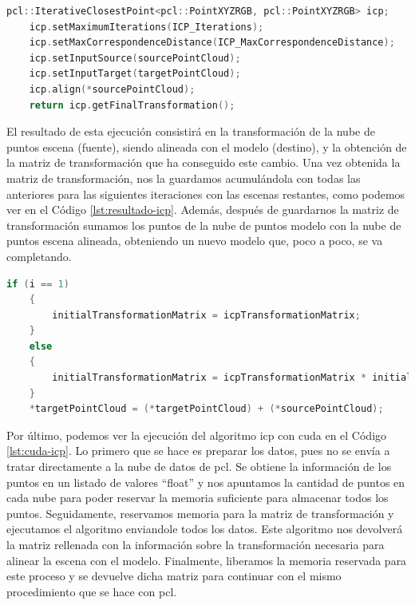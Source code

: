 \begin{lstlisting}[language={C++}, caption={Preparación y llamada al algoritmo ICP de Point Cloud Library}, label={lst:plc-icp}]
    pcl::IterativeClosestPoint<pcl::PointXYZRGB, pcl::PointXYZRGB> icp;
    icp.setMaximumIterations(ICP_Iterations);
    icp.setMaxCorrespondenceDistance(ICP_MaxCorrespondenceDistance);
    icp.setInputSource(sourcePointCloud);
    icp.setInputTarget(targetPointCloud);
    icp.align(*sourcePointCloud);
    return icp.getFinalTransformation();
\end{lstlisting}

El resultado de esta ejecución consistirá en la transformación de la nube de puntos escena (fuente), siendo alineada con el modelo (destino), y la obtención de la matriz de transformación que ha conseguido este cambio.
Una vez obtenida la matriz de transformación, nos la guardamos acumulándola con todas las anteriores para las siguientes iteraciones con las escenas restantes, como podemos ver en el Código \ref{lst:resultado-icp}.
Además, después de guardarnos la matriz de transformación sumamos los puntos de la nube de puntos modelo con la nube de puntos escena alineada, obteniendo un nuevo modelo que, poco a poco, se va completando.

\begin{lstlisting}[language={C++}, caption={Resultado del algoritmo ICP. Matriz de Transformación y nube de puntos resultante}, label={lst:resultado-icp}]
    if (i == 1)
    {
        initialTransformationMatrix = icpTransformationMatrix;
    }
    else
    {
        initialTransformationMatrix = icpTransformationMatrix * initialTransformationMatrix;
    }
    *targetPointCloud = (*targetPointCloud) + (*sourcePointCloud);
\end{lstlisting}

Por último, podemos ver la ejecución del algoritmo \gls{icp} con \gls{cuda} en el Código \ref{lst:cuda-icp}.
Lo primero que se hace es preparar los datos, pues no se envía a tratar directamente a la nube de datos de \gls{pcl}.
Se obtiene la información de los puntos en un listado de valores ``float'' y nos apuntamos la cantidad de puntos en cada nube para poder reservar la memoria suficiente para almacenar todos los puntos.
Seguidamente, reservamos memoria para la matriz de transformación y ejecutamos el algoritmo enviandole todos los datos.
Este algoritmo nos devolverá la matriz rellenada con la información sobre la transformación necesaria para alinear la escena con el modelo.
Finalmente, liberamos la memoria reservada para este proceso y se devuelve dicha matriz para continuar con el mismo procedimiento que se hace con \gls{pcl}.

